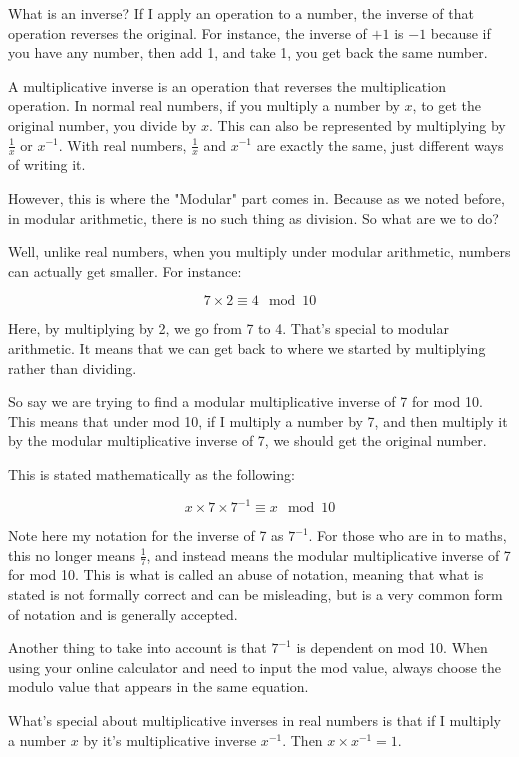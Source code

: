 \documentclass{article}
\begin{document}
  What is an inverse? If I apply an operation to a number, the inverse of that
  operation reverses the original. For instance, the inverse of $+1$ is $-1$
  because if you have any number, then add 1, and take 1, you get back the same
  number.

  A multiplicative inverse is an operation that reverses the multiplication
  operation. In normal real numbers, if you multiply a number by $x$, to get the
  original number, you divide by $x$. This can also be represented by multiplying
  by $\frac{1}{x}$ or $x^{-1}$. With real numbers, $\frac{1}{x}$ and $x^{-1}$ are exactly the same,
  just different ways of writing it.

  However, this is where the "Modular" part comes in. Because as we noted before,
  in modular arithmetic, there is no such thing as division. So what are we to do?

  Well, unlike real numbers, when you multiply under modular arithmetic, numbers
  can actually get smaller. For instance:

  \[ 7 \times 2 \equiv 4 \mod 10 \]

  Here, by multiplying by 2, we go from 7 to 4. That's special to modular arithmetic.
  It means that we can get back to where we started by multiplying rather than
  dividing.

  So say we are trying to find a modular multiplicative inverse of 7 for mod 10.
  This means that under mod 10, if I multiply a number by 7, and then multiply it
  by the modular multiplicative inverse of 7, we should get the original number.

  This is stated mathematically as the following:

  \[ x \times 7 \times 7^{-1} \equiv x \mod 10 \]

  Note here my notation for the inverse of 7 as $7^{-1}$. For those who are in
  to maths, this no longer means $\frac{1}{7}$, and instead means the modular
  multiplicative inverse of 7 for mod 10. This is what is called an abuse of
  notation, meaning that what is stated is not formally correct and can be
  misleading, but is a very common form of notation and is generally accepted.

  Another thing to take into account is that $7^{-1}$ is dependent on mod 10.
  When using your online calculator and need to input the mod
  value, always choose the modulo value that appears in the same equation.

  What's special about multiplicative inverses in real numbers is that if I multiply
  a number $x$ by it's multiplicative inverse $x^{-1}$. Then $x \times x^{-1} = 1$.
\end{document}
